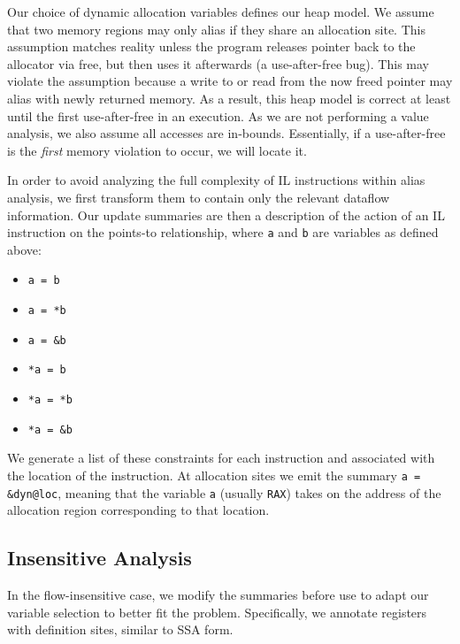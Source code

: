 Our choice of dynamic allocation variables defines our heap model.
We assume that two memory regions may only alias if they share an allocation site.
This assumption matches reality unless the program releases pointer back to the allocator via free, but then uses it afterwards (a use-after-free bug).
This may violate the assumption because a write to or read from the now freed pointer may alias with newly returned memory.
As a result, this heap model is correct at least until the first use-after-free in an execution.
As we are not performing a value analysis, we also assume all accesses are in-bounds.
Essentially, if a use-after-free is the \emph{first} memory violation to occur, we will locate it.

In order to avoid analyzing the full complexity of IL instructions within alias analysis, we first transform them to contain only the relevant dataflow information.
Our update summaries are then a description of the action of an IL instruction on the points-to relationship, where \texttt{a} and \texttt{b} are variables as defined above:

\begin{itemize}
\item \texttt{a = b}
\item \texttt{a = *b}
\item \texttt{a = \&b}
\item \texttt{*a = b}
\item \texttt{*a = *b}
\item \texttt{*a = \&b}
\end{itemize}

We generate a list of these constraints for each instruction and associated with the location of the instruction.
At allocation sites we emit the summary \texttt{a = \&dyn@loc}, meaning that the variable \texttt{a} (usually \texttt{RAX}) takes on the address of the allocation region corresponding to that location.

\subsection{Insensitive Analysis}
In the flow-insensitive case, we modify the summaries before use to adapt our variable selection to better fit the problem.
Specifically, we annotate registers with definition sites, similar to SSA form.

